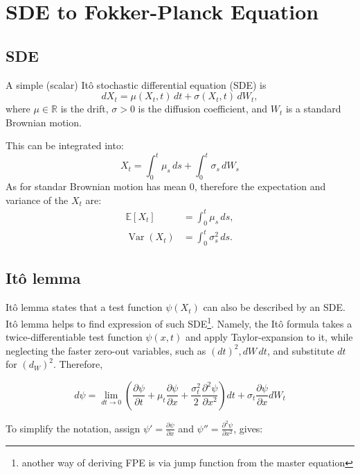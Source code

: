 \section*{SDE to Fokker-Planck Equation}

\subsection{SDE}
A simple (scalar) It\^o stochastic differential equation (SDE) is
\begin{equation}
  dX_t = \mu(X_t, t)\,dt + \sigma(X_t, t)\,dW_t,
\end{equation}
where $\mu\in\mathbb{R}$ is the drift, $\sigma>0$ is the diffusion coefficient, and $W_t$ is a standard Brownian motion.

This can be integrated into:
\begin{equation}
    X_t = \int_{0}^{t} \mu_{s}\,ds + \int_{0}^{t} \sigma_{s}\,dW_s
\end{equation}
As for standar Brownian motion has mean 0, therefore the expectation and variance of the $X_t$ are:
\begin{align}
  \mathbb{E}[X_t] &= \int_{0}^{t} \mu_{s}\,ds,\\
  \operatorname{Var}(X_t) &= \int_{0}^{t} \sigma_{s}^2\,ds.
\end{align}


\subsection{Itô lemma}
Itô lemma states that a test function $\psi(X_t)$ can also be described by an SDE. Itô lemma helps to find expression of such SDE\footnote[1]{another way of deriving FPE is via jump function from the master equation}. Namely, the Itô formula takes a twice-differentiable test function $\psi(x,t)$ and apply Taylor-expansion to it, while neglecting the faster zero-out variables, such as $(dt)^2, dW\,dt$, and substitute $dt$ for $(d_W)^2$. Therefore,

\begin{equation}
    d\psi = \lim_{dt \rightarrow 0} (\frac{\partial \psi}{\partial t}
                                    + \mu_t \frac{\partial \psi}{\partial x}
                                    +\frac{\sigma^2_t}{2}\frac{\partial^2\psi}{\partial x^2})dt
                                    + \sigma_t\frac{\partial \psi}{\partial x}dW_t
\end{equation}

To simplify the notation, assign $\psi' =  \frac{\partial \psi}{\partial x}$ and $\psi'' = \frac{\partial^2\psi}{\partial x^2}$, gives:

